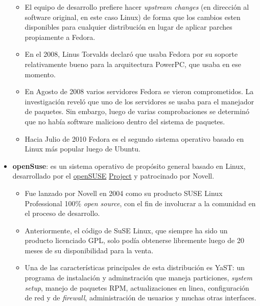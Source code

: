 \documentclass[spanish]{article}
\begin{document}
\begin{itemize}
\begin{itemize}
		\item El equipo de desarrollo prefiere hacer \textit{upstream changes} (en dirección al software original, en este caso Linux) de forma que los cambios esten disponibles para cualquier distribución en lugar de aplicar parches propiamente a Fedora.
		\item En el 2008, Linus Torvalds declaró que usaba Fedora por su soporte relativamente bueno para la arquitectura PowerPC, que usaba en ese momento\cite{LinusTorvaldsFedora}.
		\item En Agosto de 2008 varios servidores Fedora se vieron comprometidos. La investigación reveló que uno de los servidores se usaba para el manejador de paquetes. Sin embargo, luego de varias comprobaciones se determinó que no había software malicioso dentro del sistema de paquetes\cite{OnlineIntruders}.
		\item Hacia Julio de 2010 Fedora es el segundo sistema operativo basado en Linux más popular luego de Ubuntu\cite{DistroWatch}.
		\end{itemize}
	\item \textbf{openSuse}: es un sistema operativo de propósito general basado en Linux, desarrollado por el \url{openSUSE} \url{Project} y patrocinado por Novell. 
		\begin{itemize}
		\item Fue lanzado por Novell en 2004 como su producto SUSE Linux Professional 100\% \textit{open source}, con el fin de involucrar a la comunidad en el proceso de desarrollo.
		\item Anteriormente, el código de SuSE Linux, que siempre ha sido un producto licenciado GPL, solo podía obtenerse libremente luego de 20 meses de su disponibilidad para la venta.
		\item Una de las características principales de esta distribución es YaST: un programa de instalación y adminstración que maneja particiones, \textit{system setup}, manejo de paquetes RPM, actualizaciones en linea, configuración de red y de \textit{firewall}, administración de usuarios y muchas otras interfaces. 
		\end{itemize}
\end{itemize}
\end{document}
